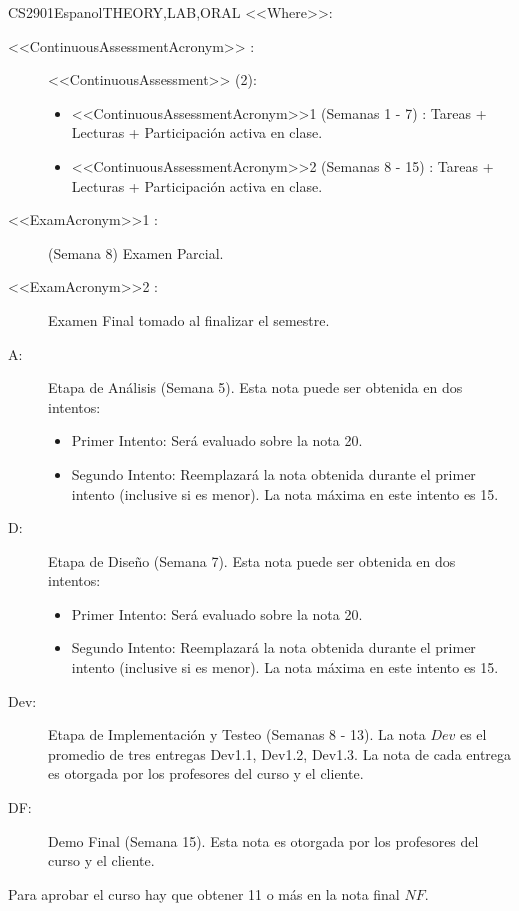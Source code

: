 \begin{evaluation}{CS2901}{Espanol}{THEORY,LAB,ORAL}
  \vspace{2mm}
  \noindent <<Where>>:
  \begin{description}
    \item[<<ContinuousAssessmentAcronym>> :] <<ContinuousAssessment>> (2):
    \begin{itemize}
        \item  <<ContinuousAssessmentAcronym>>1 (Semanas 1 - 7)  : Tareas + Lecturas + Participación activa en clase.
        \item <<ContinuousAssessmentAcronym>>2 (Semanas 8 - 15) : Tareas + Lecturas + Participación activa en clase.
    \end{itemize}
    \item[<<ExamAcronym>>1 :] (Semana 8) Examen Parcial.
    \item[<<ExamAcronym>>2 :] Examen Final tomado al finalizar el semestre.
    \item[A:] Etapa de Análisis (Semana 5). Esta nota puede ser obtenida en dos intentos:
      \begin{itemize}
        \item[] Primer Intento: Será evaluado sobre la nota 20.
        \item[] Segundo Intento: Reemplazará la nota obtenida durante el primer intento (inclusive si es menor). La nota máxima en este intento es 15.
      \end{itemize}
    \item[D:] Etapa de Diseño (Semana 7). Esta nota puede ser obtenida en dos intentos:
      \begin{itemize}
        \item[] Primer Intento: Será evaluado sobre la nota 20.
        \item[] Segundo Intento: Reemplazará la nota obtenida durante el primer intento (inclusive si es menor). La nota máxima en este intento es 15.
      \end{itemize}
    \item[Dev:] Etapa de Implementación y Testeo (Semanas 8 - 13). La nota $Dev$ es el promedio de tres entregas Dev1.1, Dev1.2, Dev1.3. La nota de cada entrega es otorgada por los profesores del curso y el cliente.
    \item[DF:] Demo Final (Semana 15). Esta nota es otorgada por los profesores del curso y el cliente.  
  \end{description}
 
  \noindent Para aprobar el curso hay que obtener 11 o más en la nota final $NF$.
  \end{evaluation}
 
